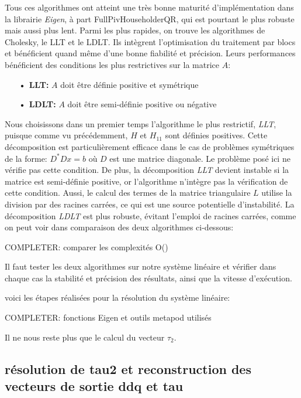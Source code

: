 \documentclass{report}
\begin{document}
Tous ces algorithmes ont atteint une très bonne maturité d'implémentation dans la librairie \emph{Eigen}, à part FullPivHouseholderQR, qui est pourtant le plus robuste mais aussi plus lent. Parmi les plus rapides, on trouve les algorithmes de Cholesky, le LLT et le LDLT. Ils intègrent l'optimisation du traitement par blocs et bénéficient quand même d'une bonne fiabilité et précision. Leurs performances bénéficient des conditions les plus restrictives sur la matrice $A$:
\begin{itemize}
\item[\textbf{• LLT:}] $A$ doit être définie positive et symétrique
\item[\textbf{• LDLT:}] $A$ doit être semi-définie positive ou négative
\end{itemize}

Nous choisissons dans un premier temps l'algorithme le plus restrictif, \emph{LLT}, puisque comme vu précédemment, $H$ et $H_{11}$ sont définies positives. Cette décomposition est particulièrement efficace dans le cas de problèmes symétriques de la forme: $D^* D x = b$ \cite{bib_eigen_LLT_desc} où $D$ est une matrice diagonale. Le problème posé ici ne vérifie pas cette condition.
De plus, la décomposition \emph{LLT} devient instable si la matrice est semi-définie positive, or l'algorithme n'intègre pas la vérification de cette condition. Aussi, le calcul des termes de la matrice triangulaire $L$ utilise la division par des racines carrées, ce qui est une source potentielle d'instabilité. La décomposition \emph{LDLT} est plus robuste, évitant l'emploi de racines carrées, comme on peut voir dans comparaison des deux algorithmes ci-dessous:

COMPLETER: comparer les complexités O()


Il faut tester les deux algorithmes sur notre système linéaire et vérifier dans chaque cas la stabilité et précision des résultats, ainsi que la vitesse d'exécution.

voici les étapes réalisées pour la résolution du système linéaire:

COMPLETER: fonctions Eigen et outils metapod utilisés

Il ne nous reste plus que le calcul du vecteur $\tau_2$.


\subsection{résolution de tau2 et reconstruction des vecteurs de sortie ddq et tau}
\end{document}
